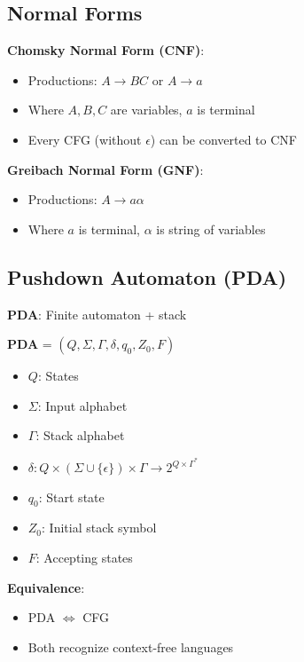\documentclass[12pt,a4paper]{report}
\begin{document}
\subsection{Normal Forms}
\begin{concept}
\textbf{Chomsky Normal Form (CNF)}:
\begin{itemize}
    \item Productions: $A \to BC$ or $A \to a$
    \item Where $A, B, C$ are variables, $a$ is terminal
    \item Every CFG (without $\epsilon$) can be converted to CNF
\end{itemize}

\textbf{Greibach Normal Form (GNF)}:
\begin{itemize}
    \item Productions: $A \to a\alpha$
    \item Where $a$ is terminal, $\alpha$ is string of variables
\end{itemize}
\end{concept}

\subsection{Pushdown Automaton (PDA)}
\begin{concept}
\textbf{PDA}: Finite automaton + stack

\textbf{PDA} = $(Q, \Sigma, \Gamma, \delta, q_0, Z_0, F)$
\begin{itemize}
    \item $Q$: States
    \item $\Sigma$: Input alphabet
    \item $\Gamma$: Stack alphabet
    \item $\delta: Q \times (\Sigma \cup \{\epsilon\}) \times \Gamma \to 2^{Q \times \Gamma^*}$
    \item $q_0$: Start state
    \item $Z_0$: Initial stack symbol
    \item $F$: Accepting states
\end{itemize}

\textbf{Equivalence}:
\begin{itemize}
    \item PDA $\Leftrightarrow$ CFG
    \item Both recognize context-free languages
\end{itemize}
\end{concept}
\end{document}
